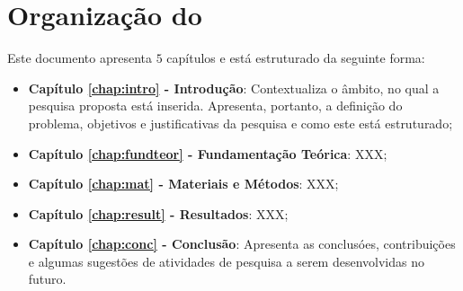 \section{Organização do \thetypework}
\label{section:organizacao}

Este documento apresenta $5$ capítulos e está estruturado da seguinte forma:

\begin{itemize}

  \item \textbf{Capítulo \ref{chap:intro} - Introdução}: Contextualiza o âmbito, no qual a pesquisa proposta está inserida. Apresenta, portanto, a definição do problema, objetivos e justificativas da pesquisa e como este \thetypeworkthree está estruturado;
  \item \textbf{Capítulo \ref{chap:fundteor} - Fundamentação Teórica}: XXX;
  \item \textbf{Capítulo \ref{chap:mat} - Materiais e Métodos}: XXX;
  \item \textbf{Capítulo \ref{chap:result} - Resultados}: XXX;
  \item \textbf{Capítulo \ref{chap:conc} - Conclusão}: Apresenta as conclusóes, contribuições e algumas sugestões de atividades de pesquisa a serem desenvolvidas no futuro.

\end{itemize}
